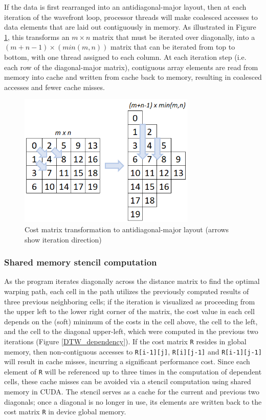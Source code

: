 \documentclass[12pt, letterpaper]{article}
\begin{document}
If the data is first rearranged into an antidiagonal-major layout, then at each
iteration of the wavefront loop, processor threads will make coalesced accesses
to data elements that are laid out contiguously in memory. As illustrated in
Figure \ref{diagonal_layout}, this transforms an $m \times n$ matrix that must be
iterated over diagonally, into a $(m+n-1) \times (min(m,n))$ matrix that can be
iterated from top to bottom, with one thread assigned to each column. At each
iteration step (i.e. each row of the diagonal-major matrix), contiguous array
elements are read from memory into cache and written from cache back to memory,
resulting in coalesced accesses and fewer cache misses.

\begin{figure}[htbp]
  \includegraphics[height=2.5in]{img/diagonal_layout.png}
  \centering
  \caption{Cost matrix transformation to antidiagonal-major layout (arrows show
    iteration direction)}
  \label{diagonal_layout}
  \end{figure}

\subsubsection{Shared memory stencil computation}

As the program iterates diagonally across the distance matrix to find the
optimal warping path, each cell in the path utilizes the previously computed
results of three previous neighboring cells; if the iteration is visualized as
proceeding from the upper left to the lower right corner of the matrix, the cost
value in each cell depends on the (soft) minimum of the costs in the cell above,
the cell to the left, and the cell to the diagonal upper-left, which were
computed in the previous two iterations (Figure \ref{DTW_dependency}). If the
cost matrix \verb|R| resides in global memory, then non-contiguous accesses to
\verb|R[i-1][j]|, \verb|R[i][j-1]| and \verb|R[i-1][j-1]| will result in cache
misses, incurring a significant performance cost. Since each element of \verb|R|
will be referenced up to three times in the computation of dependent cells,
these cache misses can be avoided via a stencil computation using shared memory
in CUDA. The stencil serves as a cache for the current and previous two
diagonals; once a diagonal is no longer in use, its elements are written back to
the cost matrix \verb|R| in device global memory.
\end{document}

